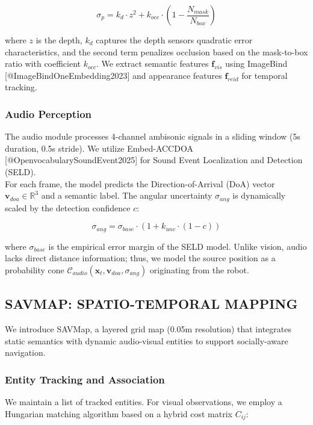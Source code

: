 \documentclass[
]{article}
\begin{document}
\[\sigma_{p} = k_d \cdot z^2 + k_{occ} \cdot \left(1 - \frac{N_{mask}}{N_{box}}\right)\]

where \(z\) is the depth, \(k_d\) captures the depth
sensor\textquotesingle s quadratic error characteristics, and the second
term penalizes occlusion based on the mask-to-box ratio with coefficient
\(k_{occ}\). We extract semantic features \(\mathbf{f}_{vis}\) using
ImageBind {[}@ImageBindOneEmbedding2023{]} and appearance features
\(\mathbf{f}_{reid}\) for temporal tracking.

\subsubsection{Audio Perception}\label{audio-perception}

The audio module processes 4-channel ambisonic signals in a sliding
window (5s duration, 0.5s stride). We utilize Embed-ACCDOA
{[}@OpenvocabularySoundEvent2025{]} for Sound Event Localization and
Detection (SELD).\\
For each frame, the model predicts the Direction-of-Arrival (DoA) vector
\(\mathbf{v}_{doa} \in \mathbb{R}^3\) and a semantic label. The angular
uncertainty \(\sigma_{ang}\) is dynamically scaled by the detection
confidence \(c\):

\[\sigma_{ang} = \sigma_{base} \cdot (1 + k_{unc} \cdot (1 - c))\]

where \(\sigma_{base}\) is the empirical error margin of the SELD model.
Unlike vision, audio lacks direct distance information; thus, we model
the source position as a probability cone
\(\mathcal{C}_{audio}(\mathbf{x}_t, \mathbf{v}_{doa}, \sigma_{ang})\)
originating from the robot.

\subsection{SAVMAP: SPATIO-TEMPORAL
MAPPING}\label{savmap-spatio-temporal-mapping}

We introduce SAVMap, a layered grid map (0.05m resolution) that
integrates static semantics with dynamic audio-visual entities to
support socially-aware navigation.

\subsubsection{Entity Tracking and
Association}\label{entity-tracking-and-association}

We maintain a list of tracked entities. For visual observations, we
employ a Hungarian matching algorithm based on a hybrid cost matrix
\(C_{ij}\):
\end{document}
